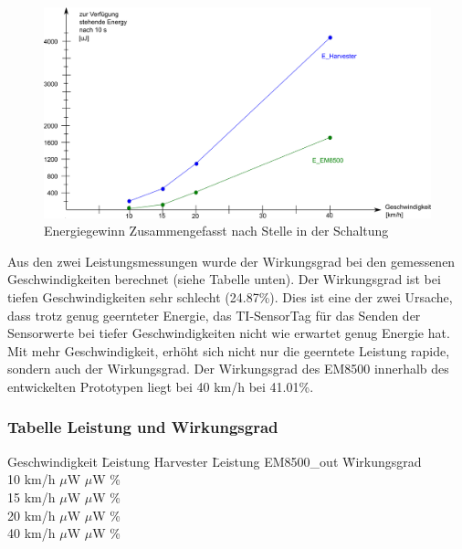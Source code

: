 \begin{figure}[ht]
    \includegraphics[width=1\textwidth]{4Resultate/imag/EnergyGewinnNachStelle.png} 
    \caption{Energiegewinn Zusammengefasst nach Stelle in der Schaltung}
    \label{zsmEnergyGewinn}
\end{figure}

Aus den zwei Leistungsmessungen wurde der Wirkungsgrad bei den gemessenen Geschwindigkeiten berechnet (siehe Tabelle unten). Der Wirkungsgrad ist bei tiefen Geschwindigkeiten sehr schlecht (24.87\thinspace\%). Dies ist eine der zwei Ursache, dass trotz genug geernteter Energie, das TI-SensorTag für das Senden der Sensorwerte bei tiefer Geschwindigkeiten nicht wie erwartet genug Energie hat. Mit mehr Geschwindigkeit, erhöht sich nicht nur die geerntete Leistung rapide, sondern auch der Wirkungsgrad. Der Wirkungsgrad des EM8500 innerhalb des entwickelten Prototypen liegt bei 40 km/h  bei 41.01\thinspace\%.  

\subsubsection*{Tabelle Leistung und Wirkungsgrad }
\begin{tabbing}
    Geschwindigkeit \quad\= Leistung Harvester \quad\= Leistung EM8500\_out \quad\= Wirkungsgrad\\[0.8ex]
    10 km/h    $\mu$W    $\mu$W \thinspace\%  \\
    15 km/h    $\mu$W   $\mu$W \thinspace\%  \\
    20 km/h  $\mu$W   $\mu$W \thinspace\%  \\
    40 km/h  $\mu$W  $\mu$W \thinspace\%  \\
\end{tabbing}   



